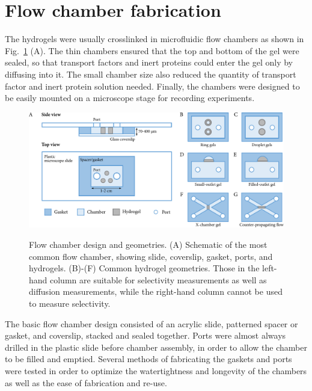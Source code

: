 


\section{Flow chamber fabrication}
\label{sec:flow-chambers}

The hydrogels were usually crosslinked in microfluidic flow chambers as shown in Fig.~\ref{fig:chamber-geometries} (A).  The thin chambers ensured that the top and bottom of the gel were sealed, so that transport factors and inert proteins could enter the gel only by diffusing into it.  The small chamber size also reduced the quantity of transport factor and inert protein solution needed.  Finally, the chambers were designed to be easily mounted on a microscope stage for recording experiments.

\begin{figure}
\caption{Flow chamber design and geometries.  (A) Schematic of the most common flow chamber, showing slide, coverslip, gasket, ports, and hydrogels.  (B)-(F) Common hydrogel geometries.  Those in the left-hand column are suitable for selectivity measurements as well as diffusion measurements, while the right-hand column cannot be used to measure selectivity.}
\centering
\includegraphics[width=\textwidth]{figs/ch03/methods-cartoon}
\label{fig:chamber-geometries}
\end{figure}

The basic flow chamber design consisted of an acrylic slide, patterned spacer or gasket, and coverslip, stacked and sealed together.  Ports were almost always drilled in the plastic slide before chamber assembly, in order to allow the chamber to be filled and emptied.  Several methods of fabricating the gaskets and ports were tested in order to optimize the watertightness and longevity of the chambers as well as the ease of fabrication and re-use.

